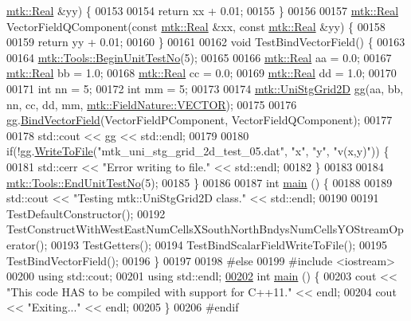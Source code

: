 \begin{DoxyCode}
      \hyperlink{group__c01-roots_gac080bbbf5cbb5502c9f00405f894857d}{mtk::Real} &yy) \{
00153 
00154   \textcolor{keywordflow}{return} xx + 0.01;
00155 \}
00156 
00157 \hyperlink{group__c01-roots_gac080bbbf5cbb5502c9f00405f894857d}{mtk::Real} VectorFieldQComponent(\textcolor{keyword}{const} \hyperlink{group__c01-roots_gac080bbbf5cbb5502c9f00405f894857d}{mtk::Real} &xx, \textcolor{keyword}{const} 
      \hyperlink{group__c01-roots_gac080bbbf5cbb5502c9f00405f894857d}{mtk::Real} &yy) \{
00158 
00159   \textcolor{keywordflow}{return} yy + 0.01;
00160 \}
00161 
00162 \textcolor{keywordtype}{void} TestBindVectorField() \{
00163 
00164   \hyperlink{classmtk_1_1Tools_afc29ecaf337a13ed2e817d3890a5a441}{mtk::Tools::BeginUnitTestNo}(5);
00165 
00166   \hyperlink{group__c01-roots_gac080bbbf5cbb5502c9f00405f894857d}{mtk::Real} aa = 0.0;
00167   \hyperlink{group__c01-roots_gac080bbbf5cbb5502c9f00405f894857d}{mtk::Real} bb = 1.0;
00168   \hyperlink{group__c01-roots_gac080bbbf5cbb5502c9f00405f894857d}{mtk::Real} cc = 0.0;
00169   \hyperlink{group__c01-roots_gac080bbbf5cbb5502c9f00405f894857d}{mtk::Real} dd = 1.0;
00170 
00171   \textcolor{keywordtype}{int} nn = 5;
00172   \textcolor{keywordtype}{int} mm = 5;
00173 
00174   \hyperlink{classmtk_1_1UniStgGrid2D}{mtk::UniStgGrid2D} gg(aa, bb, nn, cc, dd, mm, 
      \hyperlink{namespacemtk_ga4c54f2a329cfb4e56213b02a259d19e2a87752381b583740610f1dfeb07fdad7e}{mtk::FieldNature::VECTOR});
00175 
00176   gg.\hyperlink{classmtk_1_1UniStgGrid2D_ae274b24672e9bd6075bf38b015bd9083}{BindVectorField}(VectorFieldPComponent, VectorFieldQComponent);
00177 
00178   std::cout << gg << std::endl;
00179 
00180   \textcolor{keywordflow}{if}(!gg.\hyperlink{classmtk_1_1UniStgGrid2D_a1787a79e4bcee6b89c681dc7e5e2d7bc}{WriteToFile}(\textcolor{stringliteral}{"mtk\_uni\_stg\_grid\_2d\_test\_05.dat"}, \textcolor{stringliteral}{"x"}, \textcolor{stringliteral}{"y"}, \textcolor{stringliteral}{"v(x,y)"})) \{
00181     std::cerr << \textcolor{stringliteral}{"Error writing to file."} << std::endl;
00182   \}
00183 
00184   \hyperlink{classmtk_1_1Tools_aba67d9dc35c9c1c49430fcc9ea035e03}{mtk::Tools::EndUnitTestNo}(5);
00185 \}
00186 
00187 \textcolor{keywordtype}{int} \hyperlink{mtk__uni__stg__grid__2d__test_8cc_ae66f6b31b5ad750f1fe042a706a4e3d4}{main} () \{
00188 
00189   std::cout << \textcolor{stringliteral}{"Testing mtk::UniStgGrid2D class."} << std::endl;
00190 
00191   TestDefaultConstructor();
00192   TestConstructWithWestEastNumCellsXSouthNorthBndysNumCellsYOStreamOperator();
00193   TestGetters();
00194   TestBindScalarFieldWriteToFile();
00195   TestBindVectorField();
00196 \}
00197 
00198 \textcolor{preprocessor}{#else}
00199 \textcolor{preprocessor}{#include <iostream>}
00200 \textcolor{keyword}{using} std::cout;
00201 \textcolor{keyword}{using} std::endl;
\hypertarget{mtk__uni__stg__grid__2d__test_8cc_source_l00202}{}\hyperlink{mtk__uni__stg__grid__2d__test_8cc_ae66f6b31b5ad750f1fe042a706a4e3d4}{00202} \textcolor{keywordtype}{int} \hyperlink{mtk__uni__stg__grid__2d__test_8cc_ae66f6b31b5ad750f1fe042a706a4e3d4}{main} () \{
00203   cout << \textcolor{stringliteral}{"This code HAS to be compiled with support for C++11."} << endl;
00204   cout << \textcolor{stringliteral}{"Exiting..."} << endl;
00205 \}
00206 \textcolor{preprocessor}{#endif}
\end{DoxyCode}
